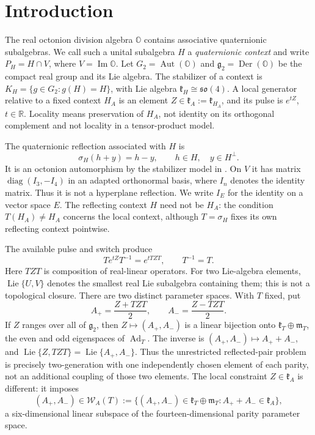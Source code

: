 \documentclass[11pt,a4paper]{article}
\newcommand{\RR}{\mathbb R}
\newcommand{\OO}{\mathbb O}
\newcommand{\Aut}{\operatorname{Aut}}
\newcommand{\Der}{\operatorname{Der}}
\newcommand{\Lie}{\operatorname{Lie}}
\newcommand{\Ad}{\operatorname{Ad}}
\begin{document}
\section{Introduction}
The real octonion division algebra $\OO$ contains associative quaternionic subalgebras.  We call such a unital subalgebra $H$ a \emph{quaternionic context} and write $P_H=H\cap V$, where $V=\operatorname{Im}\OO$.
Let $G_2=\Aut(\OO)$ and $\mathfrak g_2=\Der(\OO)$ be the compact real group and its Lie algebra.
The stabilizer of a context is $K_H=\{g\in G_2:g(H)=H\}$, with Lie algebra $\mathfrak k_H\cong\mathfrak{so}(4)$.
A local generator relative to a fixed context $H_A$ is an element $Z\in\mathfrak k_A:=\mathfrak k_{H_A}$, and its pulse is $e^{tZ}$, $t\in\RR$.
Locality means preservation of $H_A$, not identity on its orthogonal complement and not locality in a tensor-product model.

The quaternionic reflection associated with $H$ is
\[
\sigma_H(h+y)=h-y,\qquad h\in H,\quad y\in H^\perp.
\]
It is an octonion automorphism by the stabilizer model in .
On $V$ it has matrix $\operatorname{diag}(I_3,-I_4)$ in an adapted orthonormal basis, where $I_n$ denotes the identity matrix.  Thus it is not a hyperplane reflection.
We write $I_E$ for the identity on a vector space $E$.
The reflecting context $H$ need not be $H_A$: the condition $T(H_A)\ne H_A$ concerns the local context, although $T=\sigma_H$ fixes its own reflecting context pointwise.

The available pulse and switch produce
\[
Te^{tZ}T^{-1}=e^{tTZT},\qquad T^{-1}=T.
\]
Here $TZT$ is composition of real-linear operators.  For two Lie-algebra elements, $\Lie\{U,V\}$ denotes the smallest real Lie subalgebra containing them; this is not a topological closure.
There are two distinct parameter spaces.  With $T$ fixed, put
\[
A_+=\frac{Z+TZT}{2},\qquad A_-=\frac{Z-TZT}{2}.
\]
If $Z$ ranges over all of $\mathfrak g_2$, then $Z\mapsto(A_+,A_-)$ is a linear bijection onto $\mathfrak k_T\oplus\mathfrak m_T$, the even and odd eigenspaces of $\Ad_T$.
The inverse is $(A_+,A_-)\mapsto A_++A_-$, and
$\Lie\{Z,TZT\}=\Lie\{A_+,A_-\}$.
Thus the unrestricted reflected-pair problem is precisely two-generation with one independently chosen element of each parity, not an additional coupling of those two elements.
The local constraint $Z\in\mathfrak k_A$ is different: it imposes
\[
(A_+,A_-)\in\mathcal W_A(T):=
\{(A_+,A_-)\in\mathfrak k_T\oplus\mathfrak m_T:A_++A_-\in\mathfrak k_A\},
\]
a six-dimensional linear subspace of the fourteen-dimensional parity parameter space.
\end{document}
